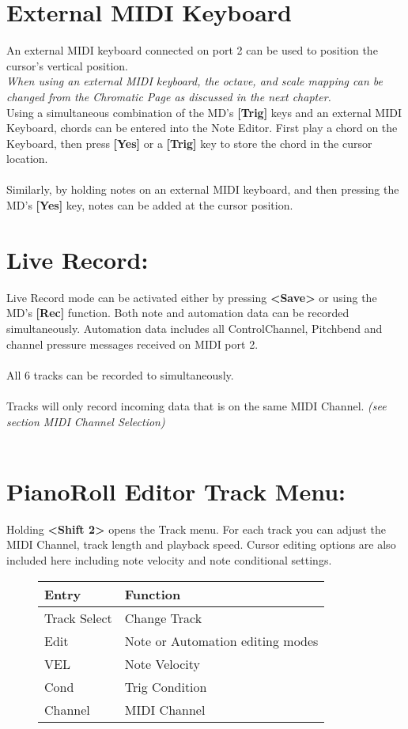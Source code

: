 \section{External MIDI Keyboard}
An external MIDI keyboard connected on port 2 can be used to position the cursor's vertical position.\\

\textit{When using an external MIDI keyboard, the octave, and scale mapping can be changed from the Chromatic Page as discussed in the next chapter.}\\

Using a simultaneous combination of the MD's \textbf{[Trig]} keys and an external MIDI Keyboard, chords can be entered into the Note Editor. First play a chord on the Keyboard, then press \textbf{[Yes]} or a \textbf{[Trig]} key to store the chord in the cursor location.
\\\\
Similarly, by holding notes on an external MIDI keyboard, and then pressing the MD's \textbf{[Yes]} key, notes can be added at the cursor position.
\section{Live Record:}
Live Record mode can be activated either by pressing  \textbf{<Save>} or using the MD's \textbf{[Rec]} function. Both note and automation data can be recorded simultaneously. Automation data includes all ControlChannel, Pitchbend and channel pressure messages received on MIDI port 2.\\\\All 6 tracks can be recorded to simultaneously.\\
\\Tracks will only record incoming data that is on the same MIDI Channel. \textit{(see section MIDI Channel Selection)}\\\\

\newpage
\section{PianoRoll Editor Track Menu:}
Holding \textbf{<Shift 2>} opens the Track menu. For each track you can adjust the MIDI Channel, track length and playback speed. Cursor editing options are also included here including note velocity and note conditional settings.

\begin{figure}[hb]
    \begin{tabular}{|l|l|}
    \hline
    \rowcolor[HTML]{C0C0C0} 
    Entry        & Function \\ \hline
    Track Select & Change Track \\ \hline
    Edit         & Note or Automation editing modes\\ \hline
    VEL         & Note Velocity\\ \hline
    Cond        & Trig Condition\\ \hline
    Channel     & MIDI Channel\\ \hline
    \end{tabular}
\end{figure}
